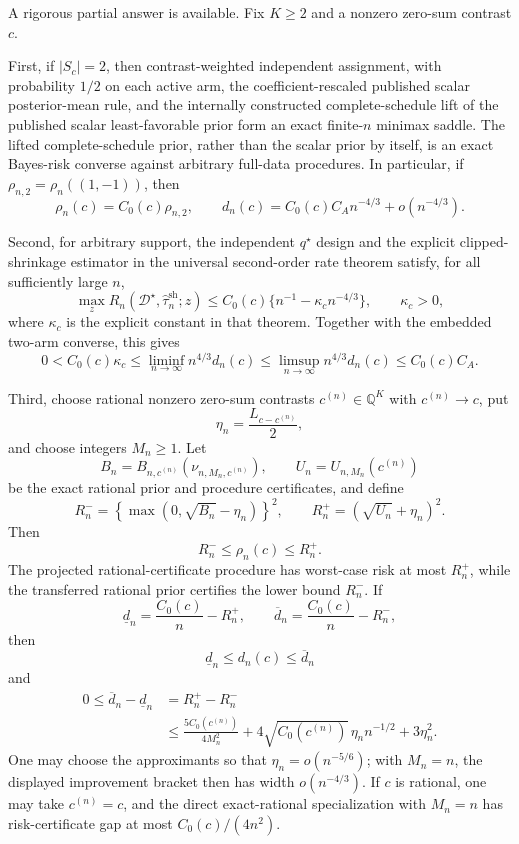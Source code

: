 A rigorous partial answer is available.  Fix \(K\geq2\) and a nonzero zero-sum contrast \(c\).

First, if \(|S_c|=2\), then contrast-weighted independent assignment, with probability \(1/2\) on each active arm, the coefficient-rescaled published scalar posterior-mean rule, and the internally constructed complete-schedule lift of the published scalar least-favorable prior form an exact finite-\(n\) minimax saddle.  The lifted complete-schedule prior, rather than the scalar prior by itself, is an exact Bayes-risk converse against arbitrary full-data procedures.  In particular, if \(\rho_{n,2}=\rho_n((1,-1))\), then
\[
 \rho_n(c)=C_0(c)\rho_{n,2},
 \qquad
 d_n(c)=C_0(c)C_A n^{-4/3}+o(n^{-4/3}).
\]

Second, for arbitrary support, the independent \(q^\star\) design and the explicit clipped-shrinkage estimator in the universal second-order rate theorem satisfy, for all sufficiently large \(n\),
\[
 \max_z R_n(\mathcal D^\star,\widehat\tau_n^{\mathrm{sh}};z)
 \leq C_0(c)\{n^{-1}-\kappa_c n^{-4/3}\},
 \qquad \kappa_c>0,
\]
where \(\kappa_c\) is the explicit constant in that theorem.  Together with the embedded two-arm converse, this gives
\[
 0<C_0(c)\kappa_c
 \leq\liminf_{n\to\infty}n^{4/3}d_n(c)
 \leq\limsup_{n\to\infty}n^{4/3}d_n(c)
 \leq C_0(c)C_A.
\]

Third, choose rational nonzero zero-sum contrasts \(c^{(n)}\in\mathbb Q^K\) with \(c^{(n)}\to c\), put
\[
 \eta_n=\frac{L_{c-c^{(n)}}}{2},
\]
and choose integers \(M_n\geq1\).  Let
\[
 B_n=B_{n,c^{(n)}}(\nu_{n,M_n,c^{(n)}}),
 \qquad
 U_n=U_{n,M_n}(c^{(n)})
\]
be the exact rational prior and procedure certificates, and define
\[
 R_n^-=\left\{\max(0,\sqrt{B_n}-\eta_n)\right\}^2,
 \qquad
 R_n^+=(\sqrt{U_n}+\eta_n)^2.
\]
Then
\[
 R_n^-\leq\rho_n(c)\leq R_n^+.
\]
The projected rational-certificate procedure has worst-case risk at most \(R_n^+\), while the transferred rational prior certifies the lower bound \(R_n^-\).  If
\[
 \underline d_n=\frac{C_0(c)}n-R_n^+,
 \qquad
 \overline d_n=\frac{C_0(c)}n-R_n^-,
\]
then
\[
 \underline d_n\leq d_n(c)\leq\overline d_n
\]
and
\[
 \begin{aligned}
 0\leq\overline d_n-\underline d_n
 &=R_n^+-R_n^-\\
 &\leq\frac{5C_0(c^{(n)})}{4M_n^2}
 +4\sqrt{C_0(c^{(n)})}\,\eta_n n^{-1/2}
 +3\eta_n^2.
 \end{aligned}
\]
One may choose the approximants so that \(\eta_n=o(n^{-5/6})\); with \(M_n=n\), the displayed improvement bracket then has width \(o(n^{-4/3})\).  If \(c\) is rational, one may take \(c^{(n)}=c\), and the direct exact-rational specialization with \(M_n=n\) has risk-certificate gap at most \(C_0(c)/(4n^2)\).

